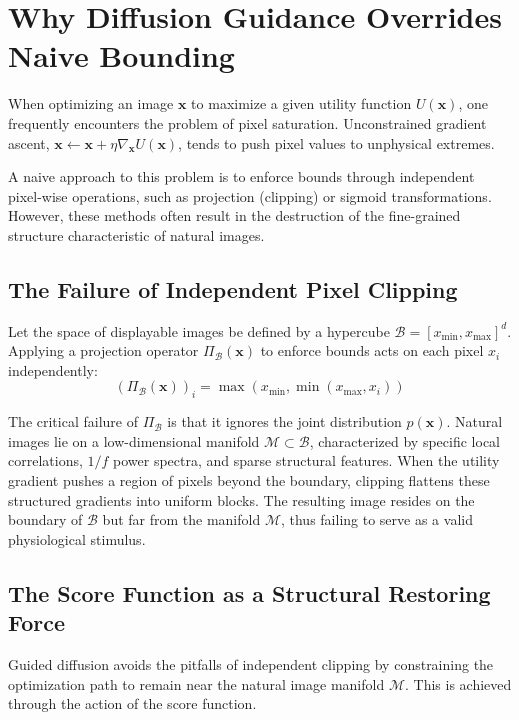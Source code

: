 \documentclass[11pt]{article}
\newcommand{\xb}{\mathbf{x}}
\begin{document}
\section{Why Diffusion Guidance Overrides Naive Bounding}

When optimizing an image $\xb$ to maximize a given utility function $U(\xb)$, one frequently encounters the problem of pixel saturation. Unconstrained gradient ascent, $\xb \leftarrow \xb + \eta \nabla_{\xb} U(\xb)$, tends to push pixel values to unphysical extremes. 

A naive approach to this problem is to enforce bounds through independent pixel-wise operations, such as projection (clipping) or sigmoid transformations. However, these methods often result in the destruction of the fine-grained structure characteristic of natural images.

\subsection{The Failure of Independent Pixel Clipping}

Let the space of displayable images be defined by a hypercube $\mathcal{B} = [x_{\min}, x_{\max}]^d$. Applying a projection operator $\Pi_{\mathcal{B}}(\xb)$ to enforce bounds acts on each pixel $x_i$ independently:
\begin{equation}
    (\Pi_{\mathcal{B}}(\xb))_i = \max(x_{\min}, \min(x_{\max}, x_i))
\end{equation}

The critical failure of $\Pi_{\mathcal{B}}$ is that it ignores the joint distribution $p(\xb)$. Natural images lie on a low-dimensional manifold $\mathcal{M} \subset \mathcal{B}$, characterized by specific local correlations, $1/f$ power spectra, and sparse structural features. When the utility gradient pushes a region of pixels beyond the boundary, clipping flattens these structured gradients into uniform blocks. The resulting image resides on the boundary of $\mathcal{B}$ but far from the manifold $\mathcal{M}$, thus failing to serve as a valid physiological stimulus.

\subsection{The Score Function as a Structural Restoring Force}

Guided diffusion avoids the pitfalls of independent clipping by constraining the optimization path to remain near the natural image manifold $\mathcal{M}$. This is achieved through the action of the score function.
\end{document}
